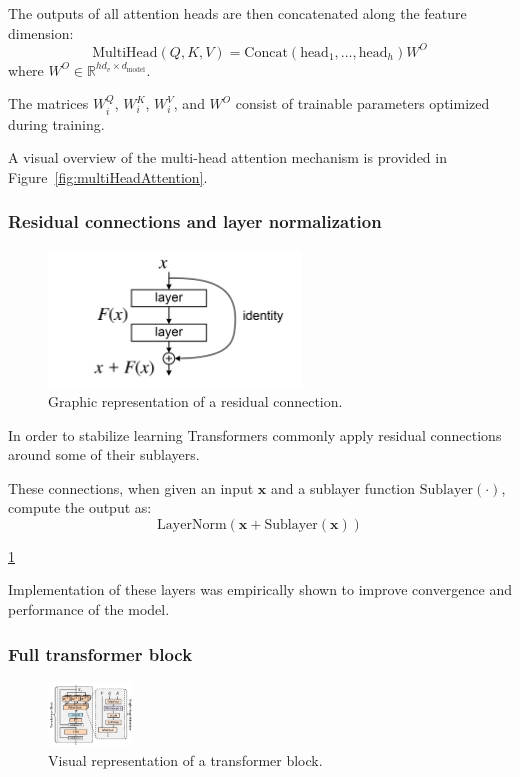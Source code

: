 \documentclass{pracalicmgr}
\begin{document}
The outputs of all attention heads are then concatenated along the feature dimension:
\[
\text{MultiHead}(Q, K, V) = \text{Concat}(\text{head}_1, \ldots, \text{head}_h)W^O
\]
where \( W^O \in \mathbb{R}^{hd_v \times d_{\text{model}}} \).

The matrices \( W^Q_i \), \( W^K_i \), \( W^V_i \), and \( W^O \) consist of trainable parameters optimized during training.

A visual overview of the multi-head attention mechanism is provided in Figure~\ref{fig:multiHeadAttention}.

\subsubsection{Residual connections and layer normalization}

\begin{figure}[h]
    \centering
    \includegraphics[width=0.6\textwidth]{src/ResBlock.png}
    \caption{Graphic representation of a residual connection\cite{resConn}.}
    \label{fig:resCon}
\end{figure}

In order to stabilize learning Transformers commonly apply residual connections around some of their sublayers.

These connections, when given an input \( \mathbf{x} \) and a sublayer function \( \text{Sublayer}(\cdot) \), compute the output as:
\[
\text{LayerNorm}(\mathbf{x} + \text{Sublayer}(\mathbf{x}))
\]

\ref{fig:resCon}

Implementation of these layers was empirically shown to improve convergence and performance of the model.


\subsubsection{Full transformer block}

\begin{figure}[h]
    \centering
    \includegraphics[width=0.2\textwidth]{src/transformerBlockSingle.pdf}
    \caption{Visual representation of a transformer block. \cite{transformerBlockSingle}}
    \label{fig:transformerEncoder}
\end{figure}
\end{document}
